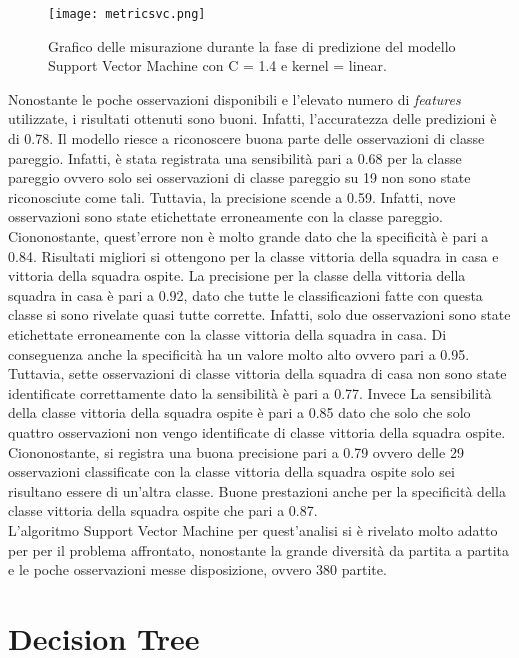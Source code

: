\begin{figure}[]
	\begin{center}
		\texttt{[image: metricsvc.png]}
		\caption{Grafico delle misurazione durante la fase di predizione del modello Support Vector Machine con \textsf{C} = 1.4 e \textsf{kernel} = linear.
		} 
		\label{fig:svcmetrics}
	\end{center}
\end{figure}
Nonostante le poche osservazioni disponibili e l'elevato numero di \emph{features} utilizzate, i risultati ottenuti sono buoni. Infatti, l'accuratezza delle predizioni è di 0.78. Il modello riesce a riconoscere buona parte delle osservazioni di classe pareggio. Infatti, è stata registrata una sensibilità pari a 0.68 per la classe pareggio ovvero solo sei osservazioni di classe pareggio su 19 non sono state riconosciute come tali. Tuttavia, la precisione scende a 0.59. Infatti, nove osservazioni sono state etichettate erroneamente con la classe pareggio. Ciononostante, quest'errore non è molto grande dato che la specificità è pari a 0.84. Risultati migliori si ottengono per la classe vittoria della squadra in casa e vittoria della squadra ospite. La precisione per la classe della vittoria della squadra in casa è pari a 0.92, dato che tutte le classificazioni fatte con questa classe si sono rivelate quasi tutte corrette. Infatti, solo due osservazioni sono state etichettate erroneamente con la classe vittoria della squadra in casa. Di conseguenza anche la specificità ha un valore molto alto ovvero pari a 0.95. Tuttavia, sette osservazioni di classe vittoria della squadra di casa non sono state identificate correttamente dato la sensibilità è pari a 0.77. Invece La sensibilità della classe vittoria della squadra ospite è pari a 0.85 dato che solo che solo quattro osservazioni non vengo identificate di classe vittoria della squadra ospite. Ciononostante, si registra una buona precisione pari a 0.79 ovvero delle 29 osservazioni classificate con la classe vittoria della squadra ospite solo sei risultano essere di un'altra classe. Buone prestazioni anche per la specificità della classe vittoria della squadra ospite che pari a 0.87.\\
L'algoritmo Support Vector Machine per quest'analisi si è rivelato molto adatto per per il problema affrontato, nonostante la grande diversità da partita a partita e le poche osservazioni messe disposizione, ovvero 380 partite.


\section{Decision Tree}

